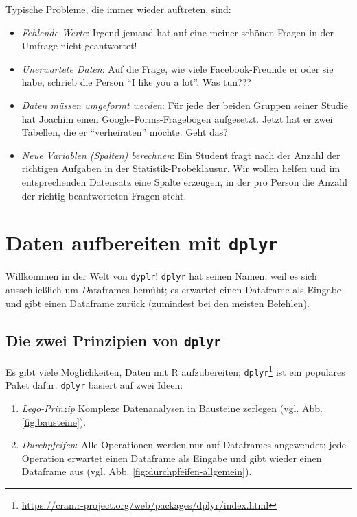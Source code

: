 \documentclass[12pt,ngerman,]{book}
\providecommand{\tightlist}{%
  \setlength{\itemsep}{0pt}\setlength{\parskip}{0pt}}
\let\rmarkdownfootnote\footnote%
\def\footnote{\protect\rmarkdownfootnote}
\theoremstyle{definition}
\theoremstyle{definition}
\theoremstyle{remark}
\begin{document}
Typische Probleme, die immer wieder auftreten, sind:

\begin{itemize}
\tightlist
\item
  \emph{Fehlende Werte}: Irgend jemand hat auf eine meiner schönen
  Fragen in der Umfrage nicht geantwortet!
\item
  \emph{Unerwartete Daten}: Auf die Frage, wie viele Facebook-Freunde er
  oder sie habe, schrieb die Person ``I like you a lot''. Was tun???
\item
  \emph{Daten müssen umgeformt werden}: Für jede der beiden Gruppen
  seiner Studie hat Joachim einen Google-Forms-Fragebogen aufgesetzt.
  Jetzt hat er zwei Tabellen, die er ``verheiraten'' möchte. Geht das?
\item
  \emph{Neue Variablen (Spalten) berechnen}: Ein Student fragt nach der
  Anzahl der richtigen Aufgaben in der Statistik-Probeklausur. Wir
  wollen helfen und im entsprechenden Datensatz eine Spalte erzeugen, in
  der pro Person die Anzahl der richtig beantworteten Fragen steht.
\end{itemize}

\section{\texorpdfstring{Daten aufbereiten mit
\texttt{dplyr}}{Daten aufbereiten mit dplyr}}\label{daten-aufbereiten-mit-dplyr}

Willkommen in der Welt von \texttt{dyplr}! \texttt{dplyr} hat seinen
Namen, weil es sich ausschließlich um \emph{D}ataframes bemüht; es
erwartet einen Dataframe als Eingabe und gibt einen Dataframe zurück
(zumindest bei den meisten Befehlen).

\subsection{\texorpdfstring{Die zwei Prinzipien von
\texttt{dplyr}}{Die zwei Prinzipien von dplyr}}\label{die-zwei-prinzipien-von-dplyr}

Es gibt viele Möglichkeiten, Daten mit R aufzubereiten;
\texttt{dplyr}\footnote{\url{https://cran.r-project.org/web/packages/dplyr/index.html}}
ist ein populäres Paket dafür. \texttt{dplyr} basiert auf zwei Ideen:

\begin{enumerate}
\def\labelenumi{\arabic{enumi}.}
\tightlist
\item
  \emph{Lego-Prinzip} Komplexe Datenanalysen in Bausteine zerlegen (vgl.
  Abb. \ref{fig:bausteine}).
\item
  \emph{Durchpfeifen}: Alle Operationen werden nur auf Dataframes
  angewendet; jede Operation erwartet einen Dataframe als Eingabe und
  gibt wieder einen Dataframe aus (vgl. Abb.
  \ref{fig:durchpfeifen-allgemein}).
\end{enumerate}
\end{document}
